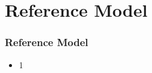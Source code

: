 \section{Reference Model}
\begin{frame}\frametitle{Reference Model}
	\begin{itemize}
		\item 1
	\end{itemize}
\end{frame}